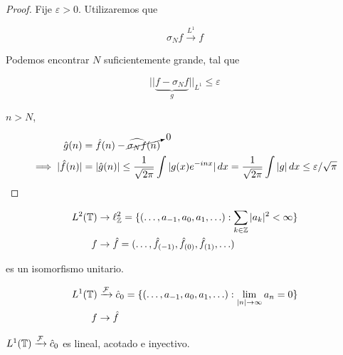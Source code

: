 \begin{proof}
    Fije $\varepsilon>0$. Utilizaremos que 

    \[\sigma_N f\xrightarrow{L^1}f\]

    Podemos encontrar $N$ suficientemente grande, tal que

    \[||\underbrace{f-\sigma_N f}_{g}||_{L^1}\leq \varepsilon\]

    $n>N$,

    \begin{align*}
        \hat g(n)&=\hat f(n)-\cancelto{0}{\widehat{\sigma_N f}(n)}\\
        \implies |\hat f(n)|&=|\hat g(n)|\leq \frac{1}{\sqrt{2\pi}}\int |g(x)e^{-inx}|\,dx=\frac{1}{\sqrt{2\pi}}\int |g|\,dx\leq \varepsilon/\sqrt{\pi}
    \end{align*}
\end{proof}

\begin{align*}
    L^2(\mathbb{T})&\to \ell_{\mathbb{Z}}^2=\{(\ldots,a_{-1},a_0,a_1,\ldots):\sum_{k\in\mathbb{Z}}|a_k|^2<\infty\}\\
    f&\to \hat f=(\ldots,\hat f_{(-1)},\hat f_{(0)},\hat f_{(1)},\ldots)
\end{align*}

es un isomorfismo unitario.

\begin{align*}
    L^1(\mathbb{T})&\xrightarrow{\mathcal{F}} \hat c_0=\{(\ldots,a_{-1},a_0,a_1,\ldots):\lim_{|n|\to\infty} a_n=0\}\\
    f&\to \hat f
\end{align*}

\begin{ftheorem}
    $L^1(\mathbb{T})\xrightarrow{\mathcal{F}} \hat c_0$ es lineal, acotado e inyectivo.
\end{ftheorem}

